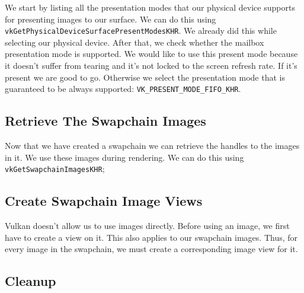 We start by listing all the presentation modes that our physical device supports
for presenting images to our surface.
We can do this using \texttt{vkGetPhysicalDeviceSurfacePresentModesKHR}.
We already did this while selecting our physical device.
After that, we check whether the mailbox presentation mode is supported.
We would like to use this present mode because it doesn't suffer from
tearing and it's not locked to the screen refresh rate.
If it's present we are good to go.
Otherwise we select the presentation mode that is guaranteed to be always supported:
\texttt{VK\_PRESENT\_MODE\_FIFO\_KHR}.

\begin{minipage}{\linewidth}{\noindent}
    
\end{minipage}

\subsection{Retrieve The Swapchain Images}

Now that we have created a swapchain we can retrieve the handles to the images
in it.
We use these images during rendering.
We can do this using \texttt{vkGetSwapchainImagesKHR};

\subsection{Create Swapchain Image Views}

Vulkan doesn't allow us to use images directly.
Before using an image, we first have to create a view on it.
This also applies to our swapchain images.
Thus, for every image in the swapchain, we must create a corresponding
image view for it.

\begin{minipage}{\linewidth}{\noindent}
    
\end{minipage}

\subsection{Cleanup}

